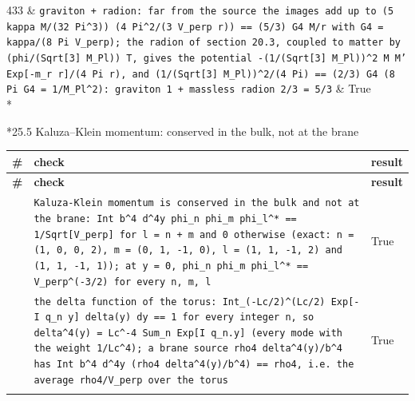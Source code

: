 \documentclass[10pt,a4paper]{article}
\makeatletter
\renewcommand\subsubsection{\@startsection{subsubsection}{3}{\z@}{-3.25ex\@plus -1ex \@minus -.2ex}{1.5ex \@plus .2ex}{\normalfont\normalsize\bfseries\raggedright}}
\makeatother
\begin{document}
{\begin{longtable}
433 & \texttt{graviton + radion: far from the source the images add up to (5 kappa M/\allowbreak{}(32 Pi\textasciicircum{}3)) (4 Pi\textasciicircum{}2/\allowbreak{}(3 V\_\allowbreak{}perp r)) == (5/\allowbreak{}3) G4 M/\allowbreak{}r with G4 = kappa/\allowbreak{}(8 Pi V\_\allowbreak{}perp); the radion of section 20.3, coupled to matter by (phi/\allowbreak{}(Sqrt[3] M\_\allowbreak{}Pl)) T, gives the potential -(1/\allowbreak{}(Sqrt[3] M\_\allowbreak{}Pl))\textasciicircum{}2 M M' Exp[-m\_\allowbreak{}r r]/\allowbreak{}(4 Pi r), and (1/\allowbreak{}(Sqrt[3] M\_\allowbreak{}Pl))\textasciicircum{}2/\allowbreak{}(4 Pi) == (2/\allowbreak{}3) G4 (8 Pi G4 = 1/\allowbreak{}M\_\allowbreak{}Pl\textasciicircum{}2): graviton 1 + massless radion 2/\allowbreak{}3 = 5/\allowbreak{}3} & True \\*
\end{longtable}}
\subsubsection*{25.5 Kaluza–Klein momentum: conserved in the bulk, not at the brane}
{\footnotesize
\begin{longtable}{>{\raggedright\arraybackslash}p{}>{\raggedright\arraybackslash}p{}>{\raggedright\arraybackslash}p{}}
\toprule
\textbf{\#} & \textbf{check} & \textbf{result} \\
\midrule\endfirsthead
\toprule
\textbf{\#} & \textbf{check} & \textbf{result} \\
\midrule\endhead
\endfoot
\bottomrule\endlastfoot
434 & \texttt{Kaluza-Klein momentum is conserved in the bulk and not at the brane: Int b\textasciicircum{}4 d\textasciicircum{}4y phi\_\allowbreak{}n phi\_\allowbreak{}m phi\_\allowbreak{}l\textasciicircum{}* == 1/\allowbreak{}Sqrt[V\_\allowbreak{}perp] for l = n + m and 0 otherwise (exact: n = (1, 0, 0, 2), m = (0, 1, -1, 0), l = (1, 1, -1, 2) and (1, 1, -1, 1)); at y = 0, phi\_\allowbreak{}n phi\_\allowbreak{}m phi\_\allowbreak{}l\textasciicircum{}* == V\_\allowbreak{}perp\textasciicircum{}(-3/\allowbreak{}2) for every n, m, l} & True \\
435 & \texttt{the delta function of the torus: Int\_\allowbreak{}(-Lc/\allowbreak{}2)\textasciicircum{}(Lc/\allowbreak{}2) Exp[-I q\_\allowbreak{}n y] delta(y) dy == 1 for every integer n, so delta\textasciicircum{}4(y) = Lc\textasciicircum{}-4 Sum\_\allowbreak{}n Exp[I q\_\allowbreak{}n.y] (every mode with the weight 1/\allowbreak{}Lc\textasciicircum{}4); a brane source rho4 delta\textasciicircum{}4(y)/\allowbreak{}b\textasciicircum{}4 has Int b\textasciicircum{}4 d\textasciicircum{}4y (rho4 delta\textasciicircum{}4(y)/\allowbreak{}b\textasciicircum{}4) == rho4, i.e. the average rho4/\allowbreak{}V\_\allowbreak{}perp over the torus} & True \\*
\end{longtable}}
\end{document}
